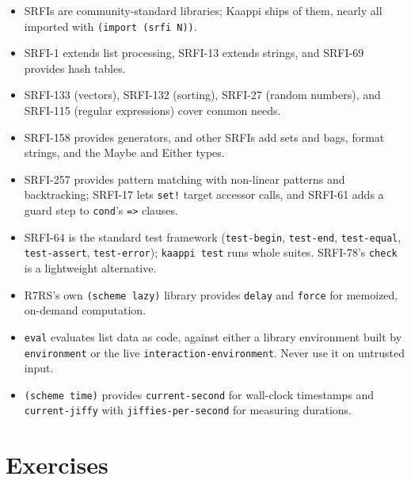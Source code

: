 \begin{itemize}
    \item SRFIs are community-standard libraries; Kaappi ships \srfitotal{} of them, nearly all imported with \texttt{(import (srfi N))}.
    \item SRFI-1 extends list processing, SRFI-13 extends strings,
    and SRFI-69 provides hash tables.
    \item SRFI-133 (vectors), SRFI-132 (sorting), SRFI-27 (random
    numbers), and SRFI-115 (regular expressions) cover common needs.
    \item SRFI-158 provides generators, and other SRFIs add sets
    and bags, format strings, and the Maybe and Either types.
    \item SRFI-257 provides pattern matching with non-linear patterns
    and backtracking; SRFI-17 lets \texttt{set!} target accessor
    calls, and SRFI-61 adds a guard step to \texttt{cond}'s
    \texttt{=>} clauses.
    \item SRFI-64 is the standard test framework
    (\texttt{test-begin}, \texttt{test-end},
    \texttt{test-equal}, \texttt{test-assert},
    \texttt{test-error}); \texttt{kaappi test} runs whole suites.
    SRFI-78's \texttt{check} is a lightweight alternative.
    \item R7RS's own \texttt{(scheme lazy)} library provides
    \texttt{delay} and \texttt{force} for memoized, on-demand
    computation.
    \item \texttt{eval} evaluates list data as code, against
    either a library environment built by
    \texttt{environment} or the live
    \texttt{interaction-\allowbreak environment}. Never use it on
    untrusted input.
    \item \texttt{(scheme time)} provides
    \texttt{current-second} for wall-clock timestamps and
    \texttt{current-jiffy} with
    \texttt{jiffies-per-second} for measuring durations.
\end{itemize}

\section*{Exercises}

